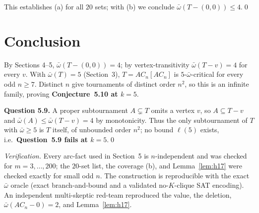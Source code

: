 \documentclass[11pt]{article}
\newcommand{\ob}{\bar\omega}
\theoremstyle{plain}
\theoremstyle{definition}
\begin{document}
This establishes (a) for all $20$ sets; with (b) we conclude $\ob(T-(0,0))\le 4$.\qed

\section{Conclusion}
By Sections 4--5, $\ob(T-(0,0))=4$; by vertex-transitivity $\ob(T-v)=4$ for every $v$. With
$\ob(T)=5$ (Section~3), $T=AC_n[AC_n]$ is $5$-$\ob$-critical for every odd $n\ge 7$. Distinct $n$
give tournaments of distinct order $n^2$, so this is an infinite family, proving
\textbf{Conjecture~5.10 at $k=5$}.

\medskip
\noindent\textbf{Question 5.9.} A proper subtournament $A\subsetneq T$ omits a vertex $v$, so
$A\subseteq T-v$ and $\ob(A)\le\ob(T-v)=4$ by monotonicity. Thus the only subtournament of $T$
with $\ob\ge5$ is $T$ itself, of unbounded order $n^2$; no bound $\ell(5)$ exists, i.e.\
\textbf{Question~5.9 fails at $k=5$}.\qed

\bigskip
\noindent\emph{Verification.} Every arc-fact used in Section~5 is $n$-independent and was checked
for $m=3,\dots,200$; the $20$-set list, the coverage (b), and Lemma~\ref{lem:h17} were checked
exactly for small odd $n$. The construction is reproducible with the exact $\ob$ oracle (exact
branch-and-bound and a validated no-$K$-clique SAT encoding). An independent multi-skeptic
red-team reproduced the value, the deletion, $\ob(AC_n-0)=2$, and Lemma~\ref{lem:h17}.
\end{document}
